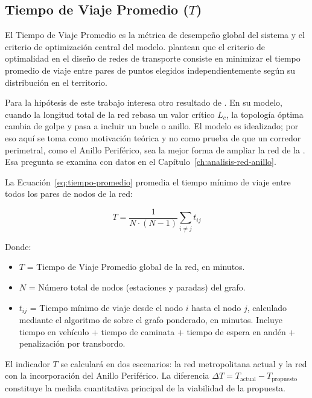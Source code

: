 
\subsection{Tiempo de Viaje Promedio \texorpdfstring{($T$)}{(T)}}
\label{subsec:tiempo-viaje}

El Tiempo de Viaje Promedio es la métrica de desempeño global del sistema y el
criterio de optimización central del modelo. \citet{aldous2019optimal} plantean
que el criterio de optimalidad en el diseño de redes de transporte consiste en
minimizar el tiempo promedio de viaje entre pares de puntos elegidos
independientemente según su distribución en el territorio.

Para la hipótesis de este trabajo interesa otro resultado de
\citet{aldous2019optimal}. En su modelo, cuando la longitud total de la red
rebasa un valor crítico $L_c$, la topología óptima cambia de golpe y pasa a
incluir un bucle o anillo. El modelo es idealizado; por eso aquí se toma como
motivación teórica y no como prueba de que un corredor perimetral, como el
Anillo Periférico, sea la mejor forma de ampliar la red de la \zmvm{}. Esa
pregunta se examina con datos en el Capítulo~\ref{ch:analisis-red-anillo}.

La Ecuación~\eqref{eq:tiempo-promedio} promedia el tiempo mínimo de viaje entre
todos los pares de nodos de la red:

\begin{equation}
    T = \frac{1}{N \cdot (N-1)} \sum_{i \neq j} t_{ij}
    \label{eq:tiempo-promedio}
\end{equation}

Donde:
\begin{itemize}
    \item $T$ = Tiempo de Viaje Promedio global de la red, en minutos.
    \item $N$ = Número total de nodos (estaciones y paradas) del grafo.
    \item $t_{ij}$ = Tiempo mínimo de viaje desde el nodo $i$ hasta el nodo $j$,
    calculado mediante el algoritmo de \dijkstra{} sobre el grafo ponderado,
    en minutos. Incluye tiempo en vehículo + tiempo de caminata + tiempo de
    espera en andén + penalización por transbordo.
\end{itemize}

El indicador $T$ se calculará en dos escenarios: la red metropolitana actual y
la red con la incorporación del Anillo Periférico. La diferencia
$\Delta T = T_{\text{actual}} - T_{\text{propuesto}}$ constituye la medida
cuantitativa principal de la viabilidad de la propuesta.

